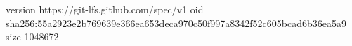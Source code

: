 version https://git-lfs.github.com/spec/v1
oid sha256:55a2923e2b769639e366ea653deca970c50f997a8342f52c605bcad6b36ea5a9
size 1048672
